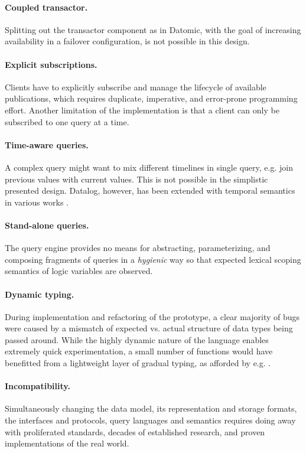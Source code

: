 \paragraph{Coupled transactor.} Splitting out the transactor component as in Datomic, with the goal of increasing availability in a failover configuration, is not possible in this design.

\paragraph{Explicit subscriptions.} Clients have to explicitly subscribe and manage the lifecycle of available publications, which requires duplicate, imperative, and error-prone programming effort. Another limitation of the implementation is that a client can only be subscribed to one query at a time.

\paragraph{Time-aware queries.} A complex query might want to mix different timelines in single query, e.g. join previous values with current values. This is not possible in the simplistic presented design. Datalog, however, has been extended with temporal semantics in various works \cite{alvaro2010dedalus, aref2015design}.

\paragraph{Stand-alone queries.} The query engine provides no means for abstracting, parameterizing, and composing fragments of queries in a \emph{hygienic} way so that expected lexical scoping semantics of logic variables are observed.

\paragraph{Dynamic typing.} During implementation and refactoring of the prototype, a clear majority of bugs were caused by a mismatch of expected vs. actual structure of data types being passed around. While the highly dynamic nature of the language enables extremely quick experimentation, a small number of functions would have benefitted from a lightweight layer of gradual typing, as afforded by e.g.  \cite{pinzaru2019towards}.

\paragraph{Incompatibility.} Simultaneously changing the data model, its representation and storage formats, the interfaces and protocols, query languages and semantics requires doing away with proliferated standards, decades of established research, and proven implementations of the real world.

